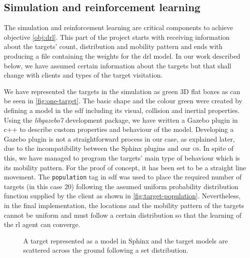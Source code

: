 \documentclass[../main.tex]{subfiles}
\begin{document}
\subsection{Simulation and reinforcement learning}

The simulation and reinforcement learning are critical
components to achieve objective \ref{obj:drl}.
This part of the project starts with receiving
information about the targets' count, distribution
and mobility pattern
and ends with producing a file containing the weights
for the \gls{drl} model.
In our work described below, we have assumed certain
information about the targets but that shall change
with clients and types of the target visitation.

We have represented the targets in the simulation
as green 3D flat boxes
as can be seen in \cref{fig:one-target}. 
The basic shape and the colour green were created by 
defining a model 
in the \gls{sdf}
including its visual, collision and inertial properties.
Using the \textit{libgazebo7} development package, 
we have written a Gazebo plugin 
in c++ to describe custom properties and  
behaviour of the model.
Developing a Gazebo plugin is not a straightforward
process in our case, as explained later, due to 
the incompatibility between the Sphinx plugins and
our \textsc{os}.
In spite of this, we have managed to program the targets' 
main type of behaviour which is its mobility pattern.
For the proof of concept, 
it has been set to be a straight line movement.
The \texttt{population} tag in \gls{sdf} was used 
to place the required number of targets (in this case 20)
following the assumed uniform probability distribution 
function supplied by the
client as shown in \cref{fig:target-population}.
Nevertheless, in the final implementation, the locations 
and the mobility pattern of the targets cannot be uniform
and must follow a certain distribution so that the learning
of the \gls{rl} agent can converge.

\begin{figure}[tb]%
    \centering
    \hspace{0.5cm}
    \caption{%
        \protect{} 
        A target represented as a model in Sphinx and
        \protect{} 
        the target models are scattered across
        the ground following a set distribution.}%
    \label{fig:target}%
\end{figure}
\end{document}
